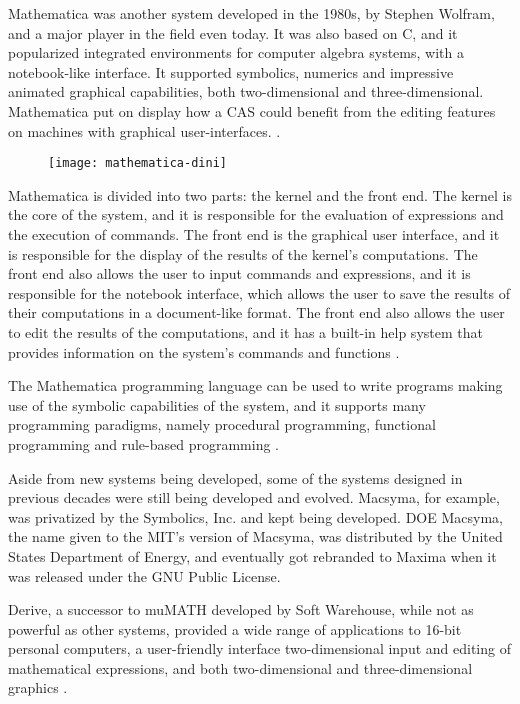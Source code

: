 Mathematica was another system developed in the 1980s, by Stephen Wolfram, and a major player in the field even today. It was also based on C, and it popularized integrated environments for computer algebra systems, with a notebook-like interface. It supported symbolics, numerics and impressive animated graphical capabilities, both two-dimensional and three-dimensional. Mathematica put on display how a CAS could benefit from the editing features on machines with graphical user-interfaces. \parencite{geddes1992algorithms}.

\begin{figure}[htb]
      {\texttt{[image: mathematica-dini]}}
\end{figure}  

Mathematica is divided into two parts: the kernel and the front end. The kernel is the core of the system, and it is responsible for the evaluation of expressions and the execution of commands. The front end is the graphical user interface, and it is responsible for the display of the results of the kernel's computations. The front end also allows the user to input commands and expressions, and it is responsible for the notebook interface, which allows the user to save the results of their computations in a document-like format. The front end also allows the user to edit the results of the computations, and it has a built-in help system that provides information on the system's commands and functions \parencite{wolfram1991mathematica}.

The Mathematica programming language can be used to write programs making use of the symbolic capabilities of the system, and it supports many programming paradigms, namely procedural programming, functional programming and rule-based programming \parencite{wolfram1991mathematica}.

Aside from new systems being developed, some of the systems designed in previous decades were still being developed and evolved. Macsyma, for example, was privatized by the Symbolics, Inc. \parencite{geddes1992algorithms} and kept being developed. DOE Macsyma, the name given to the MIT's version of Macsyma, was distributed by the United States Department of Energy, and eventually got rebranded to Maxima when it was released under the GNU Public License.

Derive, a successor to muMATH developed by Soft Warehouse, while not as powerful as other systems, provided a wide range of applications to 16-bit personal computers, a user-friendly interface two-dimensional input and editing of mathematical expressions, and both two-dimensional and three-dimensional graphics \parencite{geddes1992algorithms,derive-the-roots}.

